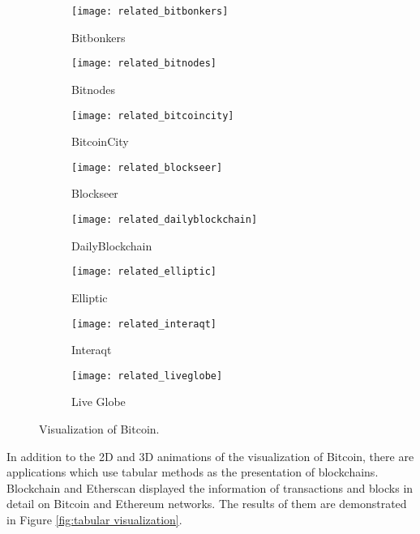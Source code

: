 \begin{figure}[htb]
    \centering
    \begin{subfigure}[b]{0.45\textwidth}
        \centering
        \texttt{[image: related\_bitbonkers]}
        \caption{Bitbonkers}
    \end{subfigure}
    \hfill
    \begin{subfigure}[b]{0.45\textwidth}
        \centering
        \texttt{[image: related\_bitnodes]}
        \caption{Bitnodes}
    \end{subfigure}

    \begin{subfigure}[b]{0.45\textwidth}
        \centering
        \texttt{[image: related\_bitcoincity]}
        \caption{BitcoinCity}
    \end{subfigure}
    \hfill
    \begin{subfigure}[b]{0.45\textwidth}
        \centering
        \texttt{[image: related\_blockseer]}
        \caption{Blockseer}
    \end{subfigure}

    \begin{subfigure}[b]{0.45\textwidth}
        \centering
        \texttt{[image: related\_dailyblockchain]}
        \caption{DailyBlockchain}
    \end{subfigure}
    \hfill
    \begin{subfigure}[b]{0.45\textwidth}
        \centering
        \texttt{[image: related\_elliptic]}
        \caption{Elliptic}
    \end{subfigure}

    \begin{subfigure}[b]{0.45\textwidth}
        \centering
        \texttt{[image: related\_interaqt]}
        \caption{Interaqt}
    \end{subfigure}
    \hfill
    \begin{subfigure}[b]{0.45\textwidth}
        \centering
        \texttt{[image: related\_liveglobe]}
        \caption{Live Globe}
    \end{subfigure}

    \caption{Visualization of Bitcoin.}
    \label{fig:visualization of bitcoin}
\end{figure}

In addition to the 2D and 3D animations of the visualization of Bitcoin, there are applications which use tabular methods as the presentation of blockchains. Blockchain \cite{blockchain} and Etherscan \cite{etherscan} displayed the information of transactions and blocks in detail on Bitcoin and Ethereum networks. The results of them are demonstrated in Figure \ref{fig:tabular visualization}.

